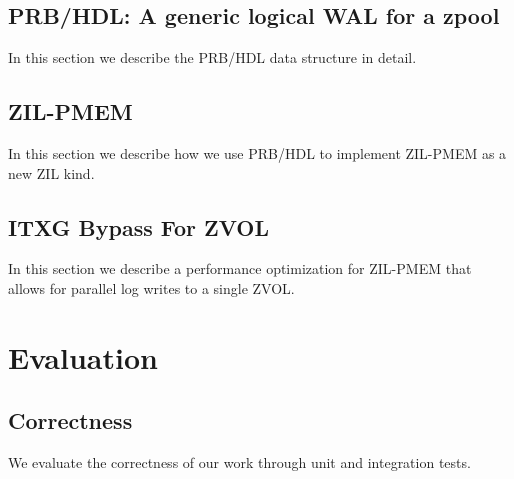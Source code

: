 \documentclass[12pt,a4paper,twoside]{book}
\begin{document}
\section{PRB/HDL: A generic logical WAL for a zpool}
In this section we describe the PRB/HDL data structure in detail.


\section{ZIL-PMEM}
In this section we describe how we use PRB/HDL to implement ZIL-PMEM as a new ZIL kind.

\section{ITXG Bypass For ZVOL}
In this section we describe a performance optimization for ZIL-PMEM that allows for parallel log writes to a single ZVOL.

\chapter{Evaluation}\label{ch:eval}
\section{Correctness}
We evaluate the correctness of our work through unit and integration tests.
\end{document}
